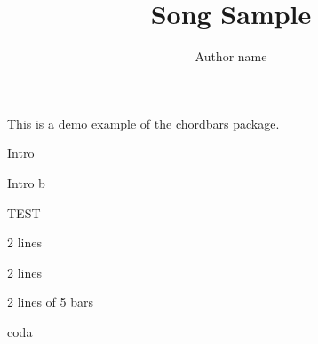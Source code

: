 \documentclass[11pt]{article}
\title{Song Sample}
\author{Author name}
\begin{document}
\bpbthree

\countbarsYes

\songtitle

\def\barsize{1.6}%
This is a demo example of the chordbars package.


\begin{chordbar}{3}{1}{Intro}
\end{chordbar}

\begin{chordbar}{5}{3}{Intro b}
{}
\end{chordbar}


\begin{chordbar}{4}{2}{TEST}
\repeatchord
\end{chordbar}



\begin{chordbar}{5}{2}{2 lines}
\repeatchord
\repeatchord
\end{chordbar}

\begin{chordbar}{11}{4}{2 lines}
\newchordline
{}
\repeatchord
\end{chordbar}

\begin{chordbar}{10}{2}{2 lines of 5 bars}
\newchordline
{}
\repeatchord
\end{chordbar}


\begin{chordbar}{11}{2}{coda}
\end{chordbar}


\printNbBars
\end{document}
